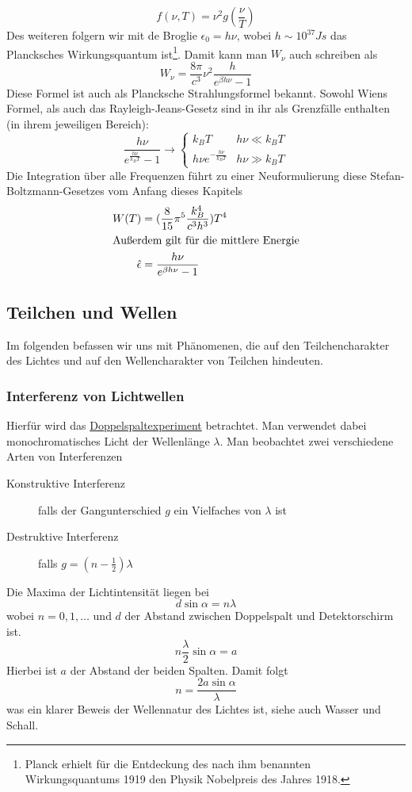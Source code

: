\documentclass[oneside]{book}
\theoremstyle{definition}
\begin{document}
$$f(\nu, T) = \nu^2 g(\frac{\nu}{T})$$
Des weiteren folgern wir mit de Broglie $\epsilon_0 = h \nu$, wobei  $h \sim 10^{37} Js$ das Plancksches Wirkungsquantum ist\footnote{Planck erhielt für die Entdeckung des nach ihm benannten Wirkungsquantums 1919 den Physik Nobelpreis des Jahres 1918.}. Damit kann man $W_\nu$ auch schreiben als
$$W_\nu = \frac{8\pi}{c^3} \nu^2 \frac{h}{e^{\beta h \nu} - 1}$$
Diese Formel ist auch als Plancksche Strahlungsformel bekannt. Sowohl Wiens Formel, als auch das Rayleigh-Jeans-Gesetz sind in ihr als Grenzfälle enthalten (in ihrem jeweiligen Bereich):
$$\frac{h \nu}{e^{\frac{h\nu}{k_B T}} - 1} \rightarrow \begin{cases}
k_B T & h\nu \ll k_B T\\
h \nu e^{- \frac{h\nu}{k_B T}} & h \nu \gg k_B T
\end{cases}$$
Die Integration über alle Frequenzen führt zu einer Neuformulierung diese Stefan-Boltzmann-Gesetzes vom Anfang dieses Kapitels
\begin{align*}
W(T) &= (\frac{8}{15} \pi^5 \frac{k_B^4}{c^3 h^3}) T^4\\
\intertext{Außerdem gilt für die mittlere Energie}
\hat{\epsilon} &= \frac{h \nu}{e^{\beta h \nu} - 1} 
\end{align*}

\subsection{Teilchen und Wellen}
Im folgenden befassen wir uns mit Phänomenen, die auf den Teilchencharakter des Lichtes und auf den Wellencharakter von Teilchen hindeuten.

\subsubsection{Interferenz von Lichtwellen}
Hierfür wird das \href{https://de.wikipedia.org/wiki/Doppelspaltexperiment}{Doppelspaltexperiment} betrachtet. Man verwendet dabei monochromatisches Licht der Wellenlänge $\lambda$. Man beobachtet zwei verschiedene Arten von Interferenzen
\begin{description}
	\item[Konstruktive Interferenz] falls der Gangunterschied $g$ ein Vielfaches von $\lambda$ ist
	\item[Destruktive Interferenz] falls $g = (n - \frac12) \lambda$
\end{description}
Die Maxima der Lichtintensität liegen bei
$$d \sin \alpha = n\lambda$$
wobei $n = 0, 1, \dots$ und $d$ der Abstand zwischen Doppelspalt und Detektorschirm ist.\
$$n \frac{\lambda}{2} \sin \alpha = a$$
Hierbei ist $a$ der Abstand der beiden Spalten.
Damit folgt 
$$n = \frac{2a \sin \alpha}{\lambda}$$
was ein klarer Beweis der Wellennatur des Lichtes ist, siehe auch Wasser und Schall.
\end{document}
